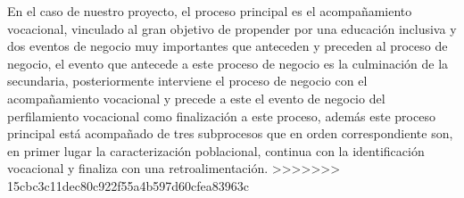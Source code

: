 En el caso de nuestro proyecto, el proceso principal es el acompañamiento vocacional, vinculado al gran objetivo de propender por una educación inclusiva y dos eventos de negocio muy importantes que anteceden y preceden al proceso de negocio, el evento que antecede a este proceso de negocio es la culminación de la secundaria, posteriormente interviene el proceso de negocio con el acompañamiento vocacional y precede a este el evento de negocio del perfilamiento vocacional como finalización a este proceso, además este proceso principal está acompañado de tres subprocesos que en orden correspondiente son, en primer lugar la caracterización poblacional, continua con la identificación vocacional y finaliza con una retroalimentación.
>>>>>>> 15cbc3c11dec80c922f55a4b597d60cfea83963c

